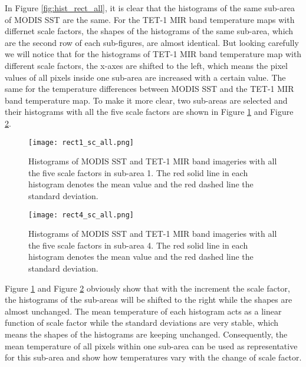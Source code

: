 \noindent In Figure \ref{fig:hist_rect_all}, it is clear that the histograms of the same sub-area of MODIS SST are the same. For the TET-1 MIR band temperature maps with differnet scale factors, the shapes of the histograms of the same sub-area, which are the second row of each sub-figures, are almost identical. But looking carefully we will notice that for the histograms of TET-1 MIR band temperature map with different scale factors, the x-axes are shifted to the left, which means the pixel values of all pixels inside one sub-area are increased with a certain value. The same for the temperature differences between MODIS SST and the TET-1 MIR band temperature map. To make it more clear, two sub-areas are selected and their histograms with all the five scale factors are shown in Figure \ref{fig:rect1_sc_all} and Figure \ref{fig:rect4_sc_all}.\\

\begin{figure}[!htbp]
\centering
\texttt{[image: rect1\_sc\_all.png]}
\caption{Histograms of MODIS SST and TET-1 MIR band imageries with all the five scale factors in sub-area 1. The red solid line in each histogram denotes the mean value and the red dashed line the standard deviation.}
\label{fig:rect1_sc_all}
\end{figure}

\begin{figure}[!htbp]
\centering
\texttt{[image: rect4\_sc\_all.png]}
\caption{Histograms of MODIS SST and TET-1 MIR band imageries with all the five scale factors in sub-area 4. The red solid line in each histogram denotes the mean value and the red dashed line the standard deviation.}
\label{fig:rect4_sc_all}
\end{figure}

\noindent Figure \ref{fig:rect1_sc_all} and Figure \ref{fig:rect4_sc_all} obviously show that with the increment the scale factor, the histograms of the sub-areas will be shifted to the right while the shapes are almost unchanged. The mean temperature of each histogram acts as a linear function of scale factor while the standard deviations are very stable, which means the shapes of the histograms are keeping unchanged. Consequently, the mean temperature of all pixels within one sub-area can be used as representative for this sub-area and show how temperatures vary with the change of scale factor.\\

